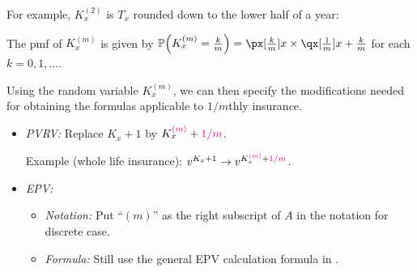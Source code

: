 \begin{enumerate}
\begin{enumerate}[label={(\arabic*)}]
For example, \(K_x^{(2)}\) is \(T_x\) rounded down to the lower half of a year:
\begin{center}
\end{center}
The pmf of \(K_x^{(m)}\) is given by
\(\prob{K_x^{(m)}=\frac{k}{m}}=\px[\frac{k}{m}]{x}\times \qx[\frac{1}{m}]{x+\frac{k}{m}}\)
for each \(k=0,1,\dotsc\).


Using the random variable \(K_x^{(m)}\), we can then specify the modifications
needed for obtaining the formulas applicable to \(1/m\)thly insurance.
\begin{itemize}
\item \emph{PVRV:} Replace \(K_x+1\) by \(K_x^{{\color{magenta}(m)}}+{\color{magenta}1/m}\).

Example (whole life insurance): \(v^{K_x+1}\to v^{K_x^{{\color{magenta}(m)}}+{\color{magenta}1/m}}\).
\item \emph{EPV:}
\begin{itemize}
\item \emph{Notation:} Put ``\((m)\)'' as the right subscript of \(A\) in the
notation for discrete case.
\item \emph{Formula:} Still use the general EPV calculation formula in
.
\end{itemize}


\end{itemize}
\end{enumerate}
\end{enumerate}
